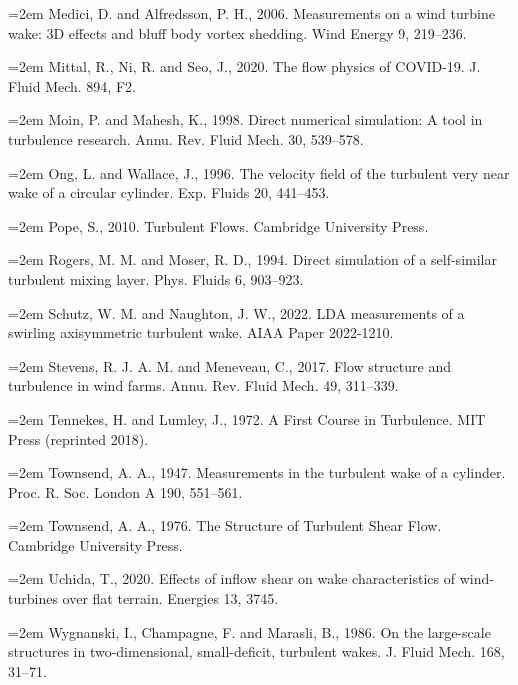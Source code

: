 \documentclass[12pt,a4paper,openany,fontset=none]{ctexbook}
\begin{document}
\par\hangindent=2em Medici, D. and Alfredsson, P. H., 2006. Measurements on a wind turbine wake: 3D effects and bluff body vortex shedding. Wind Energy 9, 219–236.
\par\hangindent=2em Mittal, R., Ni, R. and Seo, J., 2020. The flow physics of COVID-19. J. Fluid Mech. 894, F2.
\par\hangindent=2em Moin, P. and Mahesh, K., 1998. Direct numerical simulation: A tool in turbulence research. Annu. Rev. Fluid Mech. 30, 539–578.
\par\hangindent=2em Ong, L. and Wallace, J., 1996. The velocity field of the turbulent very near wake of a circular cylinder. Exp. Fluids 20, 441–453.
\par\hangindent=2em Pope, S., 2010. Turbulent Flows. Cambridge University Press.
\par\hangindent=2em Rogers, M. M. and Moser, R. D., 1994. Direct simulation of a self-similar turbulent mixing layer. Phys. Fluids 6, 903–923.
\par\hangindent=2em Schutz, W. M. and Naughton, J. W., 2022. LDA measurements of a swirling axisymmetric turbulent wake. AIAA Paper 2022-1210.
\par\hangindent=2em Stevens, R. J. A. M. and Meneveau, C., 2017. Flow structure and turbulence in wind farms. Annu. Rev. Fluid Mech. 49, 311–339.
\par\hangindent=2em Tennekes, H. and Lumley, J., 1972. A First Course in Turbulence. MIT Press (reprinted 2018).
\par\hangindent=2em Townsend, A. A., 1947. Measurements in the turbulent wake of a cylinder. Proc. R. Soc. London A 190, 551–561.
\par\hangindent=2em Townsend, A. A., 1976. The Structure of Turbulent Shear Flow. Cambridge University Press.
\par\hangindent=2em Uchida, T., 2020. Effects of inflow shear on wake characteristics of wind-turbines over flat terrain. Energies 13, 3745.
\par\hangindent=2em Wygnanski, I., Champagne, F. and Marasli, B., 1986. On the large-scale structures in two-dimensional, small-deficit, turbulent wakes. J. Fluid Mech. 168, 31–71.
\end{document}
